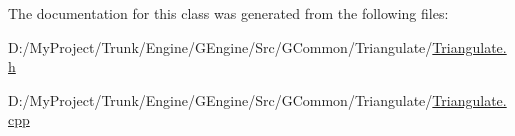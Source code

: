The documentation for this class was generated from the following files\+:\begin{DoxyCompactItemize}
\item 
D\+:/\+My\+Project/\+Trunk/\+Engine/\+G\+Engine/\+Src/\+G\+Common/\+Triangulate/\hyperlink{_triangulate_2_triangulate_8h}{Triangulate.\+h}\item 
D\+:/\+My\+Project/\+Trunk/\+Engine/\+G\+Engine/\+Src/\+G\+Common/\+Triangulate/\hyperlink{_triangulate_8cpp}{Triangulate.\+cpp}\end{DoxyCompactItemize}
